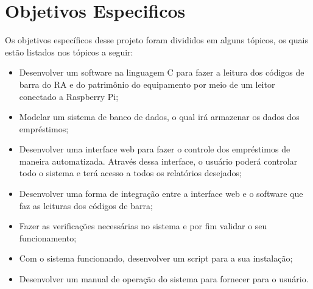 \section[Objetivos Específicos]{Objetivos Especificos}
Os objetivos específicos desse projeto foram divididos em alguns tópicos, os quais estão listados nos tópicos a seguir:

\begin{itemize}
   \item Desenvolver um software na linguagem C para fazer a leitura dos códigos de barra do RA e do patrimônio do equipamento por meio de um leitor conectado a Raspberry Pi;
   \item Modelar um sistema de banco de dados, o qual irá armazenar os dados dos empréstimos;
   \item Desenvolver uma interface web para fazer o controle dos empréstimos de maneira automatizada. Através dessa interface, o usuário poderá controlar todo o sistema e terá acesso a todos os relatórios desejados;
   \item Desenvolver uma forma de integração entre a interface web e o software que faz as
leituras dos códigos de barra;
   \item Fazer as verificações necessárias no sistema e por fim validar o seu funcionamento;
   \item Com o sistema funcionando, desenvolver um script para a sua instalação;
   \item Desenvolver um manual de operação do sistema para fornecer para o usuário.
\end{itemize}
